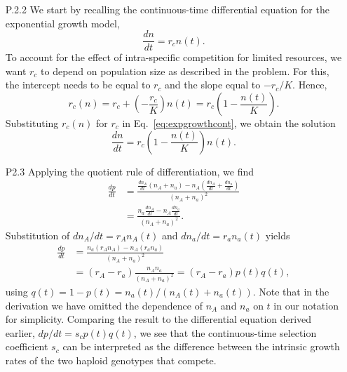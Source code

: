 \begin{enumerate}
		\item[P.2.2] We start by recalling the continuous-time differential equation for the exponential growth model,
		\begin{equation}
			\label{eq:expgrowthcont}
			\frac{dn}{dt} = r_c n(t).
		\end{equation}
		To account for the effect of intra-specific competition for limited resources, we want $r_c$ to depend on population size as described in the problem. For this, the intercept needs to be equal to $r_c$ and the slope equal to $-r_c/K$. Hence,
		\begin{equation}
			r_c(n) = r_c + \left(-\frac{r_c}{K}\right) n(t) = r_c \left( 1 - \frac{n(t)}{K}\right).
		\end{equation}
		Substituting $r_c(n)$ for $r_c$ in Eq.\ \eqref{eq:expgrowthcont}, we obtain the solution
		\begin{equation}
			\frac{dn}{dt} = r_c \left( 1 - \frac{n(t)}{K}\right) n(t).
		\end{equation}
		
		\item[P2.3] Applying the quotient rule of differentiation, we find
		\begin{equation}
		\begin{split}
			\frac{dp}{dt} & = \frac{\frac{d n_A}{dt} \left(n_A + n_a \right) - n_A \left(\frac{d n_A}{dt} + \frac{d n_a}{dt} \right)}{\left(n_A + n_a \right)^2}\\
			& = \frac{n_a \frac{d n_A}{dt} - n_A \frac{d n_a}{dt}}{\left(n_A + n_a \right)^2}.
		\end{split}
		\end{equation}
		Substitution of $d n_A / dt = r_A n_A(t)$ and $d n_a / dt = r_a n_a(t)$ yields
		\begin{equation}
		\begin{split}
			\frac{dp}{dt} & = \frac{n_a (r_A n_A) - n_A (r_a n_a)}{\left(n_A + n_a \right)^2} \\
			& = (r_A - r_a) \frac{n_A n_a}{\left(n_A + n_a \right)^2} = (r_A - r_a) p(t) q(t),
		\end{split}
		\end{equation}
		using $q(t) = 1 - p(t) = n_a(t) / (n_A(t) + n_a(t))$. Note that in the derivation we have omitted the dependence of $n_A$ and $n_a$ on $t$ in our notation for simplicity. Comparing the result to the differential equation derived earlier, $dp / dt = s_c p(t) q(t)$, we see that the continuous-time selection coefficient $s_c$ can be interpreted as the difference between the intrinsic growth rates of the two haploid genotypes that compete.
\end{enumerate}

